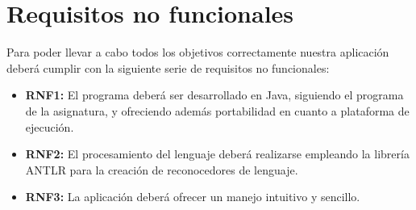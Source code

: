 \documentclass[11pt,a4paper]{report}
\begin{document}
\section{Requisitos no funcionales}
\label{sec-1.3}


Para poder llevar a cabo todos los objetivos correctamente nuestra aplicación deberá cumplir con la siguiente serie de requisitos no funcionales: \\


\begin{itemize}
\item \textbf{RNF1:} El programa deberá ser desarrollado en Java, siguiendo el programa de la asignatura, y ofreciendo además portabilidad en cuanto a
		      plataforma de ejecución.
\item \textbf{RNF2:} El procesamiento del lenguaje deberá realizarse empleando la librería ANTLR para la creación de reconocedores de lenguaje.
\item \textbf{RNF3:} La aplicación deberá ofrecer un manejo intuitivo y sencillo.
\end{itemize}
\end{document}
